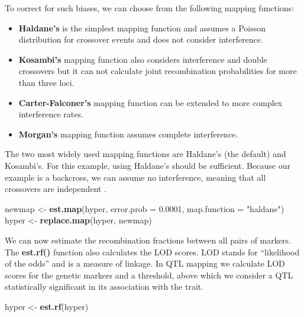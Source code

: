 \documentclass[12pt,]{book}
\newenvironment{Shaded}{\begin{snugshade}}{\end{snugshade}}
\newcommand{\KeywordTok}[1]{\textcolor[rgb]{0.27,0.27,0.27}{\textbf{{#1}}}}
\newcommand{\DataTypeTok}[1]{\textcolor[rgb]{0.27,0.27,0.27}{{#1}}}
\newcommand{\FloatTok}[1]{\textcolor[rgb]{0.06,0.06,0.06}{{#1}}}
\newcommand{\StringTok}[1]{\textcolor[rgb]{0.5,0.5,0.5}{{#1}}}
\newcommand{\NormalTok}[1]{{#1}}
\providecommand{\tightlist}{%
  \setlength{\itemsep}{0pt}\setlength{\parskip}{0pt}}
\begin{document}
To correct for such biases, we can choose from the following mapping
functions:

\begin{itemize}
\tightlist
\item
  \textbf{Haldane's} is the simplest mapping function and assumes a
  Poisson distribution for crossover events and does not consider
  interference.
\item
  \textbf{Kosambi's} mapping function also considers interference and
  double crossovers but it can not calculate joint recombination
  probabilities for more than three loci.
\item
  \textbf{Carter-Falconer's} mapping function can be extended to more
  complex interference rates.
\item
  \textbf{Morgan's} mapping function assumes complete interference.
\end{itemize}

The two most widely used mapping functions are Haldane's (the default)
and Kosambi's. For this example, using Haldane's should be sufficient.
Because our example is a backcross, we can assume no interference,
meaning that all crossovers are independent \citep{lynch1998genetics}.

\begin{Shaded}
\begin{Highlighting}[]
\NormalTok{newmap <-}\StringTok{ }\KeywordTok{est.map}\NormalTok{(hyper, }\DataTypeTok{error.prob =} \FloatTok{0.0001}\NormalTok{, }\DataTypeTok{map.function =} \StringTok{"haldane"}\NormalTok{)}
\NormalTok{hyper <-}\StringTok{ }\KeywordTok{replace.map}\NormalTok{(hyper, newmap)}
\end{Highlighting}
\end{Shaded}

We can now estimate the recombination fractions between all pairs of
markers. The \textbf{est.rf()} function also calculates the LOD scores.
LOD stands for ``likelihood of the odds'' and is a measure of linkage.
In QTL mapping we calculate LOD scores for the genetic markers and a
threshold, above which we consider a QTL statistically significant in
its association with the trait.

\begin{Shaded}
\begin{Highlighting}[]
\NormalTok{hyper <-}\StringTok{ }\KeywordTok{est.rf}\NormalTok{(hyper)}
\end{Highlighting}
\end{Shaded}
\end{document}
